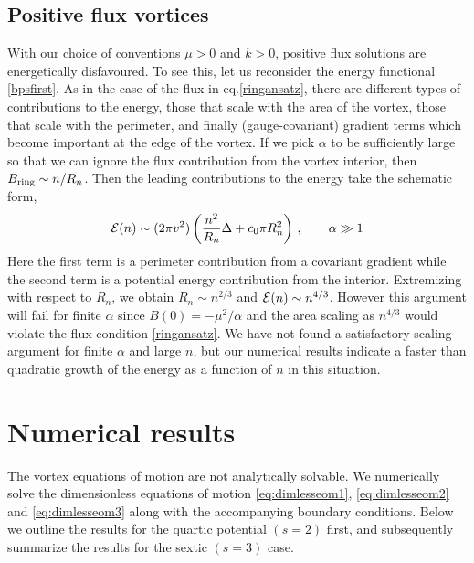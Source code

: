 \documentclass[12pt,a4paper]{article}
\def\be{\begin{equation}}
\def\ee{\end{equation}}
\begin{document}
\subsection{Positive flux vortices}
With our choice of conventions  $\mu >0$ and $k>0$, positive flux solutions are energetically disfavoured. To see this, let us  reconsider the energy functional \eqref{bpsfirst}.  As in the case of the flux in eq.\eqref{ringansatz}, there are different types of contributions to the energy, those that scale with the area of the vortex, those that scale with the perimeter, and finally (gauge-covariant) gradient  terms which become important at the edge of the vortex.
If we pick $\alpha$ to be sufficiently large so that we can ignore the flux contribution from the vortex interior, then 
$B_{\rm ring}\sim n/R_n$. Then the leading contributions to the energy take the schematic form,
\be
{\cal E}(n)\sim (2\pi v^2)\left(\frac{n^2}{R_n}\Delta + c_0\pi R_n^2 \right)\,,\qquad \alpha\gg1
\ee
Here the first term is a perimeter contribution from a covariant gradient while the second term is a potential energy contribution from the interior. Extremizing with respect to $R_n$, we obtain $R_n\sim n^{2/3}$ and ${\cal E}(n)\sim n^{4/3}$.
However this argument will fail for  finite $\alpha$ since $B(0)=-\mu^2/\alpha$ and the area scaling as $n^{4/3}$ would violate  the flux condition \eqref{ringansatz}.  We have not found a satisfactory scaling argument for finite $\alpha$ and large $n$, but our numerical results indicate a faster than quadratic growth of the energy as a function of $n$ in this situation.


%

\section{Numerical results}
The vortex equations of motion are not analytically solvable. We numerically solve the dimensionless equations of motion \eqref{eq:dimlesseom1}, \eqref{eq:dimlesseom2} and \eqref{eq:dimlesseom3} along with the accompanying boundary conditions. Below we outline the results for the quartic potential $(s=2)$ first, and subsequently  summarize the results for the sextic $(s=3)$ case.
\end{document}
